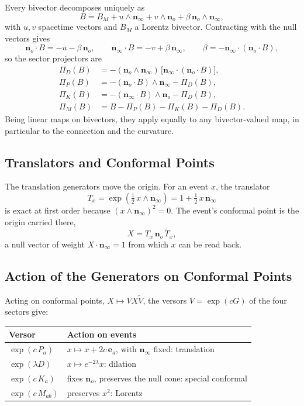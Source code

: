 \documentclass[11pt,a4paper]{article}
\newcommand{\nzero}{\mathbf{n}_o}
\newcommand{\ninf}{\mathbf{n}_\infty}
\newcommand{\e}{\mathbf{e}}
\newcommand{\wedgeprod}{\mathbin{\wedge}}
\newcommand{\rev}[1]{\widetilde{#1}}
\begin{document}
Every bivector decomposes uniquely as
\[
    B=B_M+u\wedgeprod\ninf+v\wedgeprod\nzero+\beta\,\nzero\wedgeprod\ninf,
\]
with \(u,v\) spacetime vectors and \(B_M\) a Lorentz bivector.
Contracting with the null vectors gives
\[
    \nzero\cdot B=-u-\beta\,\nzero,\qquad
    \ninf\cdot B=-v+\beta\,\ninf,\qquad
    \beta=-\ninf\cdot(\nzero\cdot B),
\]
so the sector projectors are
\begin{align*}
    \Pi_D(B)&=-(\nzero\wedgeprod\ninf)\,
        \bigl[\ninf\cdot(\nzero\cdot B)\bigr],\\
    \Pi_P(B)&=-(\nzero\cdot B)\wedgeprod\ninf-\Pi_D(B),\\
    \Pi_K(B)&=-(\ninf\cdot B)\wedgeprod\nzero-\Pi_D(B),\\
    \Pi_M(B)&=B-\Pi_P(B)-\Pi_K(B)-\Pi_D(B).
\end{align*}
Being linear maps on bivectors, they apply equally to any
bivector-valued map, in particular to the connection and the
curvature.

\subsection{Translators and Conformal Points}

The translation generators move the origin. For an event \(x\), the
translator
\[
    T_x=\exp\left(\tfrac12\,x\wedgeprod\ninf\right)
    =1+\tfrac12\,x\,\ninf
\]
is exact at first order because \((x\wedgeprod\ninf)^2=0\). The
event's conformal point is the origin carried there,
\[
    \boxed{
        X=T_x\,\nzero\,\rev{T}_x,
    }
\]
a null vector of weight \(X\cdot\ninf=1\) from which \(x\) can be read
back.

\subsection{Action of the Generators on Conformal Points}

Acting on conformal points, \(X\mapsto VX\rev V\), the versors
\(V=\exp(cG)\) of the four sectors give:

\begin{center}
\begin{tabular}{ll}
    \toprule
    Versor & Action on events\\
    \midrule
    \(\exp(c\,P_a)\) & \(x\mapsto x+2c\,\e_a\), with \(\ninf\) fixed:
        translation\\
    \(\exp(\lambda D)\) & \(x\mapsto e^{-2\lambda}x\): dilation\\
    \(\exp(c\,K_a)\) & fixes \(\nzero\), preserves the null cone:
        special conformal\\
    \(\exp(c\,M_{ab})\) & preserves \(x^2\): Lorentz\\
    \bottomrule
\end{tabular}
\end{center}
\end{document}
